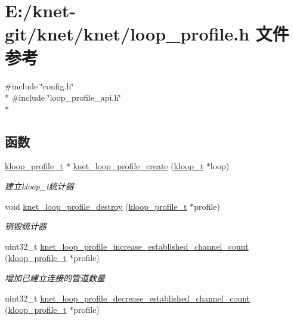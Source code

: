 \hypertarget{a00096}{}\section{E\+:/knet-\/git/knet/knet/loop\+\_\+profile.h 文件参考}
\label{a00096}
{\ttfamily \#include \char`\"{}config.\+h\char`\"{}}\\*
{\ttfamily \#include \char`\"{}loop\+\_\+profile\+\_\+api.\+h\char`\"{}}\\*
\subsection*{函数}
\begin{DoxyCompactItemize}
\item 
\hyperlink{a00066_ab75a5c23099a6118c469ed160b277f28_ab75a5c23099a6118c469ed160b277f28}{kloop\+\_\+profile\+\_\+t} $\ast$ \hyperlink{a00096_a2ceadcfacc62456cf26ac88ebe09fd50_a2ceadcfacc62456cf26ac88ebe09fd50}{knet\+\_\+loop\+\_\+profile\+\_\+create} (\hyperlink{a00066_a97fc76209a58362019f1ded9169e397f_a97fc76209a58362019f1ded9169e397f}{kloop\+\_\+t} $\ast$loop)
\begin{DoxyCompactList}\small\item\em 建立kloop\+\_\+t统计器 \end{DoxyCompactList}\item 
void \hyperlink{a00096_a760cc20cb3dc6a361e6b5f67576f2bbc_a760cc20cb3dc6a361e6b5f67576f2bbc}{knet\+\_\+loop\+\_\+profile\+\_\+destroy} (\hyperlink{a00066_ab75a5c23099a6118c469ed160b277f28_ab75a5c23099a6118c469ed160b277f28}{kloop\+\_\+profile\+\_\+t} $\ast$profile)
\begin{DoxyCompactList}\small\item\em 销毁统计器 \end{DoxyCompactList}\item 
uint32\+\_\+t \hyperlink{a00096_ab75ba9cdc68d1b4ec059974df4b67165_ab75ba9cdc68d1b4ec059974df4b67165}{knet\+\_\+loop\+\_\+profile\+\_\+increase\+\_\+established\+\_\+channel\+\_\+count} (\hyperlink{a00066_ab75a5c23099a6118c469ed160b277f28_ab75a5c23099a6118c469ed160b277f28}{kloop\+\_\+profile\+\_\+t} $\ast$profile)
\begin{DoxyCompactList}\small\item\em 增加已建立连接的管道数量 \end{DoxyCompactList}\item 
uint32\+\_\+t \hyperlink{a00096_ae34c1df8f99b26184f7380c90cc1e799_ae34c1df8f99b26184f7380c90cc1e799}{knet\+\_\+loop\+\_\+profile\+\_\+decrease\+\_\+established\+\_\+channel\+\_\+count} (\hyperlink{a00066_ab75a5c23099a6118c469ed160b277f28_ab75a5c23099a6118c469ed160b277f28}{kloop\+\_\+profile\+\_\+t} $\ast$profile)

\end{DoxyCompactItemize}
